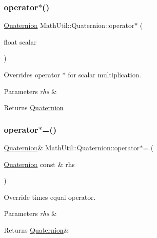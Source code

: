 \subsubsection{\texorpdfstring{operator$\ast$()}{operator*()}\hspace{0.1cm}{\footnotesize\ttfamily [2/2]}}
{\footnotesize\ttfamily \hyperlink{structMathUtil_1_1Quaternion}{Quaternion} Math\+Util\+::\+Quaternion\+::operator$\ast$ (\begin{DoxyParamCaption}\item[{float}]{scalar }\end{DoxyParamCaption})\hspace{0.3cm}{\ttfamily [inline]}}



Overrides operator $\ast$ for scalar multiplication. 


\begin{DoxyParams}{Parameters}
{\em rhs} & \\
\hline
\end{DoxyParams}
\begin{DoxyReturn}{Returns}
\hyperlink{structMathUtil_1_1Quaternion}{Quaternion} 
\end{DoxyReturn}
\mbox{\label{structMathUtil_1_1Quaternion_afc522c18afb72f8f63178d5b55ba963a}} 
\subsubsection{\texorpdfstring{operator$\ast$=()}{operator*=()}\hspace{0.1cm}{\footnotesize\ttfamily [1/2]}}
{\footnotesize\ttfamily \hyperlink{structMathUtil_1_1Quaternion}{Quaternion}\& Math\+Util\+::\+Quaternion\+::operator$\ast$= (\begin{DoxyParamCaption}\item[{\hyperlink{structMathUtil_1_1Quaternion}{Quaternion} const \&}]{rhs }\end{DoxyParamCaption})\hspace{0.3cm}{\ttfamily [inline]}}



Override times equal operator. 


\begin{DoxyParams}{Parameters}
{\em rhs} & \\
\hline
\end{DoxyParams}
\begin{DoxyReturn}{Returns}
\hyperlink{structMathUtil_1_1Quaternion}{Quaternion}\& 
\end{DoxyReturn}
\mbox{\label{structMathUtil_1_1Quaternion_aa8d8617b9a2968e7731244ed983506aa}} 
